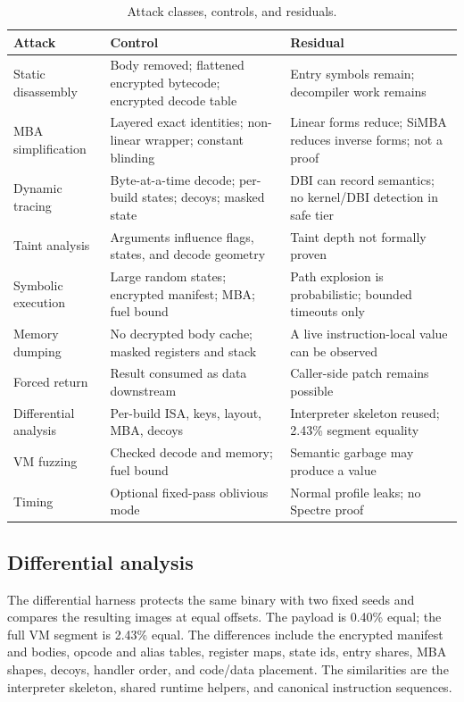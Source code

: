 \begin{table}[htbp]
\centering
\small
\caption{Attack classes, controls, and residuals.}
\label{tab:attacks}
\begin{tabularx}{\textwidth}{@{}p{}p{}X@{}}
\toprule
Attack & Control & Residual \\
\midrule
Static disassembly & Body removed; flattened encrypted bytecode; encrypted decode table & Entry symbols remain; decompiler work remains \\
MBA simplification & Layered exact identities; non-linear wrapper; constant blinding & Linear forms reduce; SiMBA reduces inverse forms; not a proof \\
Dynamic tracing & Byte-at-a-time decode; per-build states; decoys; masked state & DBI can record semantics; no kernel/DBI detection in safe tier \\
Taint analysis & Arguments influence flags, states, and decode geometry & Taint depth not formally proven \\
Symbolic execution & Large random states; encrypted manifest; MBA; fuel bound & Path explosion is probabilistic; bounded timeouts only \\
Memory dumping & No decrypted body cache; masked registers and stack & A live instruction-local value can be observed \\
Forced return & Result consumed as data downstream & Caller-side patch remains possible \\
Differential analysis & Per-build ISA, keys, layout, MBA, decoys & Interpreter skeleton reused; 2.43\% segment equality \\
VM fuzzing & Checked decode and memory; fuel bound & Semantic garbage may produce a value \\
Timing & Optional fixed-pass oblivious mode & Normal profile leaks; no Spectre proof \\
\bottomrule
\end{tabularx}
\end{table}

\subsection{Differential analysis}

The differential harness protects the same binary with two fixed seeds and
compares the resulting images at equal offsets. The payload is 0.40\% equal; the
full VM segment is 2.43\% equal. The differences include the encrypted manifest
and bodies, opcode and alias tables, register maps, state ids, entry shares,
MBA shapes, decoys, handler order, and code/data placement. The similarities are
the interpreter skeleton, shared runtime helpers, and canonical instruction
sequences.

